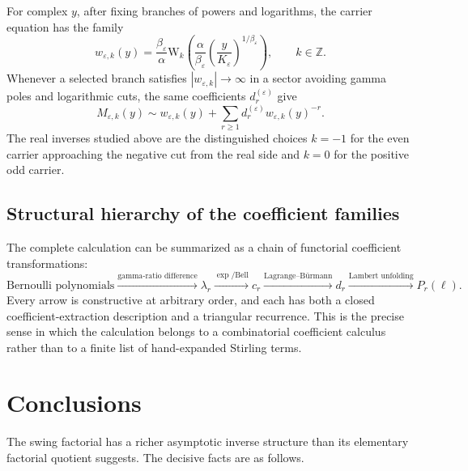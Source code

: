 \documentclass[11pt,a4paper]{article}
\theoremstyle{clean}
\theoremstyle{definition}
\newcommand{\eps}{\varepsilon}
\newcommand{\al}{\alpha}
\newcommand{\be}{\beta}
\newcommand{\W}{\mathrm W}
\begin{document}
For complex \(y\), after fixing branches of powers and logarithms, the carrier equation has the family
\begin{equation}
 w_{\eps,k}(y)=\frac{\be_\eps}{\al}
 \W_k\!\left(
 \frac{\al}{\be_\eps}
 \left(\frac{y}{K_\eps}\right)^{1/\be_\eps}
 \right),
 \qquad k\in\mathbb Z.
 \label{eq:complex-carriers}
\end{equation}
Whenever a selected branch satisfies \(|w_{\eps,k}|\to\infty\) in a sector avoiding gamma poles and logarithmic cuts, the same coefficients \(d_r^{(\eps)}\) give
\begin{equation}
 M_{\eps,k}(y)\sim w_{\eps,k}(y)+
 \sum_{r\ge1}d_r^{(\eps)}w_{\eps,k}(y)^{-r}.
 \label{eq:complex-inverse}
\end{equation}
The real inverses studied above are the distinguished choices \(k=-1\) for the even carrier approaching the negative cut from the real side and \(k=0\) for the positive odd carrier.

\subsection{Structural hierarchy of the coefficient families}

The complete calculation can be summarized as a chain of functorial coefficient transformations:
\begin{equation}
 \boxed{
 \text{Bernoulli polynomials}
 \xrightarrow{\text{gamma-ratio difference}}
 \lambda_r
 \xrightarrow{\exp/\text{Bell}}
 c_r
 \xrightarrow{\text{Lagrange--B\"urmann}}
 d_r
 \xrightarrow{\text{Lambert unfolding}}
 P_r(\ell).}
 \label{eq:coefficient-hierarchy}
\end{equation}
Every arrow is constructive at arbitrary order, and each has both a closed coefficient-extraction description and a triangular recurrence.  This is the precise sense in which the calculation belongs to a combinatorial coefficient calculus rather than to a finite list of hand-expanded Stirling terms.

\section{Conclusions}
\label{sec:conclusion}

The swing factorial has a richer asymptotic inverse structure than its elementary factorial quotient suggests.  The decisive facts are as follows.
\end{document}
